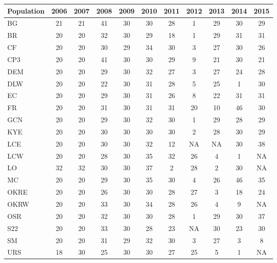 \documentclass[12pt, oneside, titlepage]{article}   	%
\begin{document}
 \label{tab:titleviab} 
\begin{table}[ht]
\centering
\begin{tabular}{lcccccccccc}
  \hline
  \hline
Population & 2006 & 2007 & 2008 & 2009 & 2010 & 2011 & 2012 & 2013 & 2014 & 2015 \\ 
  \hline
BG &  21 &  21 &  41 &  30 &  30 &  28 &   1 &  29 &  30 &  29 \\ 
  BR &  20 &  20 &  32 &  30 &  29 &  18 &   1 &  29 &  31 &  31 \\ 
  CF &  20 &  20 &  30 &  29 &  34 &  30 &   3 &  27 &  30 &  26 \\ 
  CP3 &  20 &  20 &  41 &  30 &  30 &  29 &   9 &  21 &  30 &  21 \\ 
  DEM &  20 &  20 &  29 &  30 &  32 &  27 &   3 &  27 &  24 &  28 \\ 
  DLW &  20 &  20 &  22 &  30 &  31 &  28 &   5 &  25 &   1 &  30 \\ 
  EC &  20 &  20 &  29 &  30 &  31 &  26 &   8 &  22 &  31 &  31 \\ 
  FR &  20 &  20 &  31 &  30 &  31 &  31 &  20 &  10 &  46 &  30 \\ 
  GCN &  20 &  20 &  29 &  30 &  32 &  30 &   1 &  29 &  28 &  29 \\ 
  KYE &  20 &  20 &  30 &  30 &  30 &  30 &   2 &  28 &  30 &  29 \\ 
  LCE &  20 &  20 &  30 &  30 &  32 &  12 & NA & NA &  30 &  38 \\ 
  LCW &  20 &  20 &  28 &  30 &  35 &  32 &  26 &   4 &   1 & NA \\ 
  LO &  32 &  32 &  30 &  30 &  37 &   2 &  28 &   2 &  30 & NA \\ 
  MC &  20 &  20 &  29 &  30 &  35 &  30 &   4 &  26 &  46 &  35 \\ 
  OKRE &  20 &  20 &  26 &  30 &  30 &  28 &  27 &   3 &  18 &  24 \\ 
  OKRW &  20 &  20 &  33 &  30 &  34 &  28 &  26 &   4 &   9 & NA \\ 
  OSR &  20 &  20 &  32 &  30 &  30 &  28 &   1 &  29 &  30 &  37 \\ 
  S22 &  20 &  20 &  33 &  30 &  28 &  23 & NA &  30 &  23 &  30 \\ 
  SM &  20 &  20 &  31 &  29 &  32 &  30 &   3 &  27 &   3 &   8 \\ 
  URS &  18 &  30 &  25 &  30 &  30 &  27 &  25 &   5 &   1 & NA \\ 
   \hline
\end{tabular}
\end{table}
 
\end{document}
